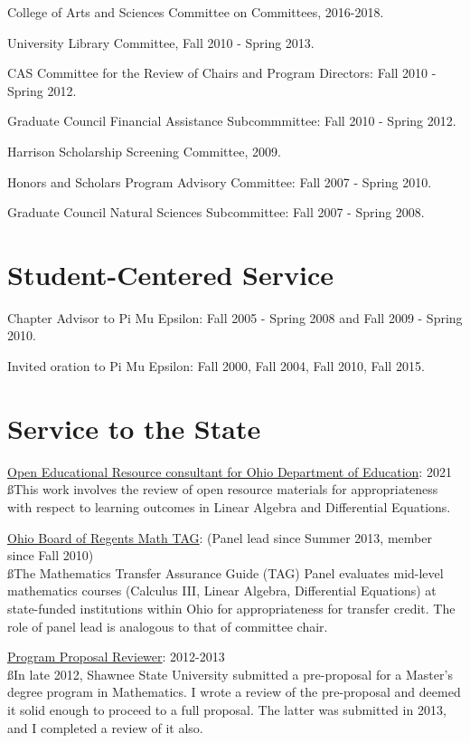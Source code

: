 \documentclass[overlapped,line,letterpaper]{res}
\begin{document}
\begin{resume}
College of Arts and Sciences Committee on Committees, 2016-2018.

University Library Committee, Fall 2010 - Spring 2013.

CAS Committee for the Review of Chairs and Program Directors: Fall 2010 - Spring 2012.

Graduate Council Financial Assistance Subcommmittee: Fall 2010 - Spring 2012.

Harrison Scholarship Screening Committee, 2009.

Honors and Scholars Program Advisory Committee: Fall 2007 - Spring 2010.

Graduate Council Natural Sciences Subcommittee: Fall 2007 - Spring 2008.

\newpage

\large
\section{\bf Student-Centered Service}
\vspace{3mm}
\normalsize

Chapter Advisor to Pi Mu Epsilon: Fall 2005 - Spring 2008 and Fall 2009 - Spring 2010.

Invited oration to Pi Mu Epsilon: Fall 2000, Fall 2004, Fall 2010, Fall 2015.


\large
\section{\bf Service to the State}
\vspace{3mm}
\normalsize


\underline{Open Educational Resource consultant for Ohio Department of Education}: 2021 \\
{\ss This work involves the review of open resource materials for appropriateness with respect to learning outcomes in Linear Algebra and Differential Equations.}

\underline{Ohio Board of Regents Math TAG}: (Panel lead since Summer 2013,  member since Fall 2010) \\
{\ss The Mathematics Transfer Assurance Guide (TAG) Panel evaluates mid-level mathematics courses (Calculus III, Linear Algebra, Differential Equations) at state-funded institutions within Ohio for appropriateness for transfer credit.  The role of panel lead is analogous to that of committee chair.}

\underline{Program Proposal Reviewer}: 2012-2013 \\
{\ss In late 2012, Shawnee State University submitted a pre-proposal for a Master's degree program in Mathematics.  I wrote a review of the pre-proposal and deemed it solid enough to proceed to a full proposal.  The latter was submitted in 2013, and I completed a review of it also.}


\end{resume}
\end{document}
